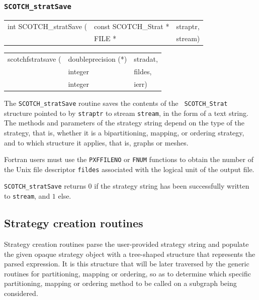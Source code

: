 \subsubsection{{\tt SCOTCH\_stratSave}}

\begin{itemize}
\progsyn

{\tt\begin{tabular}{l@{}ll}
int SCOTCH\_stratSave ( & const SCOTCH\_Strat * & straptr, \\
                        & FILE *                & stream)
\end{tabular}}

{\tt\begin{tabular}{l@{}ll}
scotchfstratsave ( & doubleprecision (*) & stradat, \\
                   & integer             & fildes,  \\
                   & integer             & ierr)
\end{tabular}}

\progdes

The {\tt SCOTCH\_stratSave} routine saves the contents of the {\tt
SCOTCH\_\lbt Strat} structure pointed to by {\tt straptr} to stream
{\tt stream}, in the form of a text string. The methods and
parameters of the strategy string depend on the type of the strategy,
that is, whether it is a bipartitioning, mapping, or ordering
strategy, and to which structure it applies, that is, graphs or
meshes.

Fortran users must use the {\tt PXFFILENO} or {\tt FNUM} functions to
obtain the number of the Unix file descriptor {\tt fildes} associated
with the logical unit of the output file.

\progret

{\tt SCOTCH\_stratSave} returns $0$ if the strategy string has been
successfully written to {\tt stream}, and $1$ else.
\end{itemize}

\subsection{Strategy creation routines}
\label{sec-lib-strat-creation}

Strategy creation routines parse the user-provided strategy string and
populate the given opaque strategy object with a tree-shaped structure
that represents the parsed expression. It is this structure that will
be later traversed by the generic routines for partitioning, mapping or
ordering, so as to determine which specific partitioning, mapping or
ordering method to be called on a subgraph being considered.

